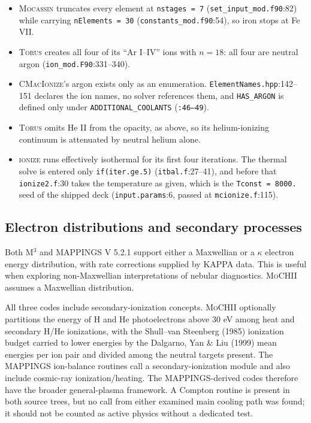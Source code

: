 \documentclass[english,a4paper]{my_memo}
\newcommand{\code}[1]{\texttt{#1}}
\newcommand{\MoCHII}{\textsc{MoCHII}}
\newcommand{\Mthree}{M$^3$}
\newcommand{\Mappings}{MAPPINGS V 5.2.1}
\newcommand{\Wood}{\textsc{ionize}}
\newcommand{\CMI}{\textsc{CMacIonize}}
\newcommand{\Torus}{\textsc{Torus}}
\newcommand{\Mocassin}{\textsc{Mocassin}}
\begin{document}
\begin{itemize}[leftmargin=2em]
  \code{lgDebug} (\code{photon\_\allowbreak mod.f90}:1491--1493, \code{:1730--1732})
  with everything otherwise landing in \code{Jste} (\code{:1488--1489},
  \code{:1727--1728}), and \code{nPhotoDif} enters the ion balance only in
  the \code{lgDebug} branch (\code{update\_\allowbreak mod.f90}:1489 versus
  \code{:1495}).  \code{lgDebug} defaults to \code{.false.}
  (\code{set\_\allowbreak input\_\allowbreak mod.f90}:44).
\item \Mocassin{} truncates every element at \code{nstages = 7}
  (\code{set\_\allowbreak input\_\allowbreak mod.f90}:82) while carrying \code{nElements = 30}
  (\code{constants\_\allowbreak mod.f90}:54), so iron stops at Fe VII.
\item \Torus{} creates all four of its ``Ar I--IV'' ions with $n = 18$: all
  four are neutral argon (\code{ion\_mod.F90}:331--340).
\item \CMI{}'s argon exists only as an enumeration.
  \code{ElementNames.hpp}:142--151 declares the ion names, no solver
  references them, and \code{HAS\_ARGON} is defined only under
  \code{ADDITIONAL\_\allowbreak COOLANTS} (\code{:46--49}).
\item \Torus{} omits He II from the opacity, as above, so its
  helium-ionizing continuum is attenuated by neutral helium alone.
\item \Wood{} runs effectively isothermal for its first four iterations.  The
  thermal solve is entered only \code{if(iter.ge.5)} (\code{itbal.f}:27--41),
  and before that \code{ionize2.f}:30 takes the temperature as given, which
  is the \code{Tconst = 8000.} seed of the shipped deck
  (\code{input.params}:6, passed at \code{mcionize.f}:115).
\end{itemize}

\subsection{Electron distributions and secondary processes}

Both \Mthree{} and \Mappings{} support either a Maxwellian or a $\kappa$
electron energy distribution, with rate corrections supplied by KAPPA
data.  This is
useful when exploring non-Maxwellian interpretations of nebular
diagnostics.  \MoCHII{} assumes a Maxwellian distribution.

All three codes include secondary-ionization concepts.  \MoCHII{} optionally
partitions the energy of H and He photoelectrons above 30 eV among heat
and secondary H/He ionizations, with the Shull--van Steenberg (1985)
ionization budget carried to lower energies by the Dalgarno, Yan \& Liu
(1999) mean energies per ion pair and divided among the neutral targets
present.  The MAPPINGS
ion-balance routines call a secondary-ionization module and also include
cosmic-ray ionization/heating.  The MAPPINGS-derived codes therefore have
the broader general-plasma framework.  A Compton routine is present in
both source trees, but no call from either examined main cooling path was
found; it should not be counted as active physics without a dedicated test.
\end{document}
